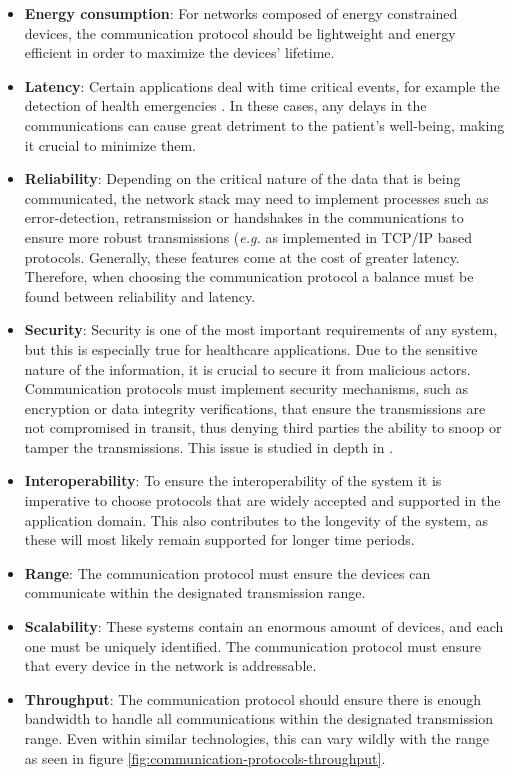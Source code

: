 \begin{itemize}
    \item \textbf{Energy consumption}: For networks composed of energy constrained devices, the communication protocol should be lightweight and energy efficient in order to maximize the devices' lifetime. 
    \item \textbf{Latency}: Certain applications deal with time critical events, for example the detection of health emergencies \cite{Catarinucci2015}. In these cases, any delays in the communications can cause great detriment to the patient's well-being, making it crucial to minimize them.
    \item \textbf{Reliability}: Depending on the critical nature of the data that is being communicated, the network stack may need to implement processes such as error-detection, retransmission or handshakes in the communications to ensure more robust transmissions (\textit{e.g.} as implemented in TCP/IP based protocols. Generally, these features come at the cost of greater latency. Therefore, when choosing the communication protocol a balance must be found between reliability and latency.
    \item \textbf{Security}: Security is one of the most important requirements of any system, but this is especially true for healthcare applications. Due to the sensitive nature of the information, it is crucial to secure it from malicious actors. Communication protocols must implement security mechanisms, such as encryption or data integrity verifications, that ensure the transmissions are not compromised in transit, thus denying third parties the ability to snoop or tamper the transmissions. This issue is studied in depth in \cite{Gope2016}.
    \item \textbf{Interoperability}: To ensure the interoperability of the system it is imperative to choose protocols that are widely accepted and supported in the application domain. This also contributes to the longevity of the system, as these will most likely remain supported for longer time periods. 
    \item \textbf{Range}: The communication protocol must ensure the devices can communicate within the designated transmission range.
    \item \textbf{Scalability}: These systems contain an enormous amount of devices, and each one must be uniquely identified. The communication protocol must ensure that every device in the network is addressable.
    \item \textbf{Throughput}: The communication protocol should ensure there is enough bandwidth to handle all communications within the designated transmission range. Even within similar technologies, this can vary wildly with the range as seen in figure \ref{fig:communication-protocols-throughput}.  

\end{itemize}


